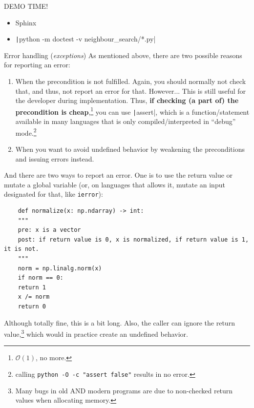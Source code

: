 \documentclass[10pt,
aspectratio=169
]{beamer}
\begin{document}
\begin{frame}
	\begin{center}
		{\LARGE DEMO TIME!}
	\end{center}
	
	\begin{itemize}
		\item Sphinx
		\item \texttt|python -m doctest -v neighbour_search/*.py|
	\end{itemize}
\end{frame}
\begin{frame}{Error handling (\textit{exceptions})}
As mentioned above, there are two possible reasons for reporting an error:\begin{enumerate}
	\item When the precondition is not fulfilled. Again, you should normally not check that, and thus, not report an error for that. However... This is still useful for the developer during implementation. Thus, \textbf{if checking (a part of) the precondition is cheap},\footnote{$\mathcal{O}(1)$, no more.} you can use \texttt|assert|, which is a function/statement available in many languages that is only compiled/interpreted in ``debug'' mode.\footnote{calling \texttt{python -O -c "assert false"} results in no error.}
	\item When you want to avoid undefined behavior by weakening the preconditions and issuing errors instead.
\end{enumerate}
\end{frame}

\begin{frame}[fragile]
And there are two ways to report an error. One is to use the return value or mutate a global variable (or, on languages that allows it, mutate an input designated for that, like \texttt{ierror}):\begin{verbatim}
	def normalize(x: np.ndarray) -> int:
	"""
	pre: x is a vector
	post: if return value is 0, x is normalized, if return value is 1, it is not.
	"""
	norm = np.linalg.norm(x)
	if norm == 0:
	return 1
	x /= norm
	return 0
\end{verbatim}
Although totally fine, this is a bit long. Also, the caller can ignore the return value,\footnote{Many bugs in old AND modern programs are due to non-checked return values when allocating memory.} which would in practice create an undefined behavior.
\vspace{1em}
\end{frame}
\end{document}
